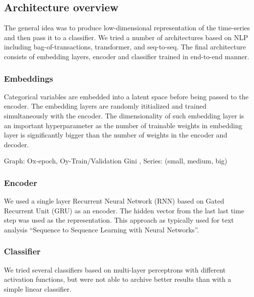 \documentclass{sigkddExp}
\begin{document}
\subsection{Architecture overview}
The general idea was to produce low-dimensional representation of the time-series and then pass it to a classifier. We tried a number of architectures based on NLP including bag-of-transactions, transformer, and seq-to-seq. 
The final architecture consists of embedding layers, encoder and classifier trained in end-to-end manner.

\subsubsection{Embeddings}

Categorical variables are embedded into a latent space before being passed to the encoder. The embedding layers are randomly ititialized and trained simultaneously with the encoder.
The dimensionality of such embedding layer is an important hyperparameter as the number of trainable weights in embedding layer is significantly bigger than the number of weights in the encoder and decoder.  

Graph: Ox-epoch, Oy-Train/Validation Gini , Series: (small, medium, big)

\subsubsection{Encoder}

We used a single layer Recurrent Neural Network (RNN) based on Gated Recurrent Unit (GRU)\cite{DBLP:journals/corr/ChoMGBSB14} as an encoder.  The hidden vector from the last last time step was used as the representation. This approach as typically used for text analysis “Sequence to Sequence Learning with Neural Networks”\cite{NIPS2014_5346}.

\subsubsection{Classifier}

We tried several classifiers based on multi-layer perceptrons with different activation functions, but were not able to archive better results than with a simple linear classifier.
\end{document}
